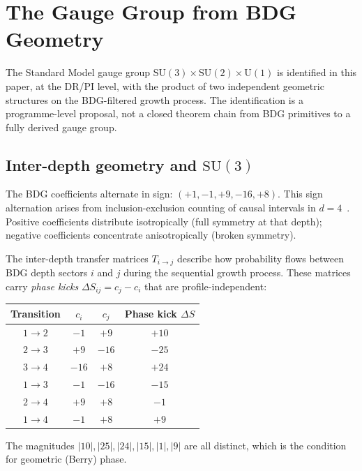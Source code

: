\documentclass[11pt]{article}
\begin{document}
\section{The Gauge Group from BDG Geometry}
\label{sec:gauge}

The Standard Model gauge group $\mathrm{SU}(3)\times\mathrm{SU}(2)\times\mathrm{U}(1)$ is identified in this paper, at the DR/PI level, with the product of two independent geometric structures on the BDG-filtered growth process. The identification is a programme-level proposal, not a closed theorem chain from BDG primitives to a fully derived gauge group.

\subsection{Inter-depth geometry and $\mathrm{SU}(3)$}

The BDG coefficients alternate in sign: $(+1,-1,+9,-16,+8)$. This sign alternation arises from inclusion-exclusion counting of causal intervals in $d=4$~\cite{Benincasa2010}. Positive coefficients distribute isotropically (full symmetry at that depth); negative coefficients concentrate anisotropically (broken symmetry).

The inter-depth transfer matrices $T_{i\to j}$ describe how probability flows between BDG depth sectors $i$ and $j$ during the sequential growth process. These matrices carry \emph{phase kicks} $\Delta S_{ij}=c_j-c_i$ that are profile-independent:

\begin{center}
\begin{tabular}{cccc}
\toprule
Transition & $c_i$ & $c_j$ & Phase kick $\Delta S$ \\
\midrule
$1\to 2$ & $-1$ & $+9$ & $+10$ \\
$2\to 3$ & $+9$ & $-16$ & $-25$ \\
$3\to 4$ & $-16$ & $+8$ & $+24$ \\
$1\to 3$ & $-1$ & $-16$ & $-15$ \\
$2\to 4$ & $+9$ & $+8$ & $-1$ \\
$1\to 4$ & $-1$ & $+8$ & $+9$ \\
\bottomrule
\end{tabular}
\end{center}

The magnitudes $|10|,|25|,|24|,|15|,|1|,|9|$ are all distinct, which is the condition for geometric (Berry) phase.
\end{document}
